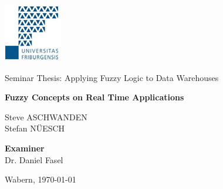 
\begin{titlepage} 
	\begin{center}
		
		\includegraphics[scale=2]{images/unifr.jpg}\\
		
		\vspace{0.5cm}
		
		
	
		\vspace{2cm}
		
		\begin{Large}
		Seminar Thesis: Applying Fuzzy Logic to Data Warehouses\\
		\end{Large}
		
		\vspace{2cm}
		
		\begin{huge}
			{\sf \bf Fuzzy Concepts on Real Time Applications}
		\end{huge}
		
				
		\vspace{2cm}
		
		 Steve ASCHWANDEN \\
		 Stefan \textsc{N\"UESCH}\\
		
		\vspace{1.5cm}
		
		{\bf Examiner}\\
		Dr. Daniel Fasel\\
		\vspace{2.5cm}
		
		
		Wabern, \today\\
		
				
	\end{center}
\end{titlepage}
